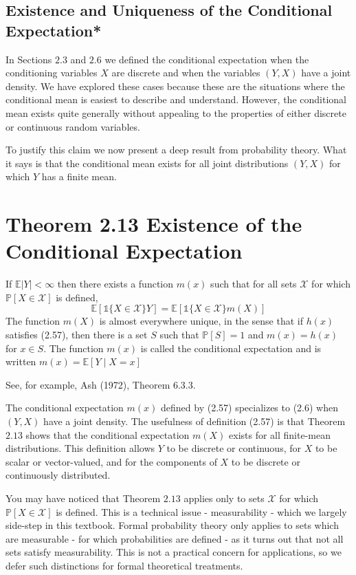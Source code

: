 \documentclass[10pt]{article}
\begin{document}
\subsection{Existence and Uniqueness of the Conditional Expectation*}
In Sections $2.3$ and $2.6$ we defined the conditional expectation when the conditioning variables $X$ are discrete and when the variables $(Y, X)$ have a joint density. We have explored these cases because these are the situations where the conditional mean is easiest to describe and understand. However, the conditional mean exists quite generally without appealing to the properties of either discrete or continuous random variables.

To justify this claim we now present a deep result from probability theory. What it says is that the conditional mean exists for all joint distributions $(Y, X)$ for which $Y$ has a finite mean.

\section{Theorem 2.13 Existence of the Conditional Expectation}
If $\mathbb{E}|Y|<\infty$ then there exists a function $m(x)$ such that for all sets $\mathscr{X}$ for which $\mathbb{P}[X \in \mathscr{X}]$ is defined,
$$
\mathbb{E}[\mathbb{1}\{X \in \mathscr{X}\} Y]=\mathbb{E}[\mathbb{1}\{X \in \mathscr{X}\} m(X)]
$$
The function $m(X)$ is almost everywhere unique, in the sense that if $h(x)$ satisfies (2.57), then there is a set $S$ such that $\mathbb{P}[S]=1$ and $m(x)=h(x)$ for $x \in S$. The function $m(x)$ is called the conditional expectation and is written $m(x)=\mathbb{E}[Y \mid X=x]$

See, for example, Ash (1972), Theorem 6.3.3.

The conditional expectation $m(x)$ defined by (2.57) specializes to (2.6) when $(Y, X)$ have a joint density. The usefulness of definition (2.57) is that Theorem $2.13$ shows that the conditional expectation $m(X)$ exists for all finite-mean distributions. This definition allows $Y$ to be discrete or continuous, for $X$ to be scalar or vector-valued, and for the components of $X$ to be discrete or continuously distributed.

You may have noticed that Theorem $2.13$ applies only to sets $\mathscr{X}$ for which $\mathbb{P}[X \in \mathscr{X}]$ is defined. This is a technical issue - measurability - which we largely side-step in this textbook. Formal probability theory only applies to sets which are measurable - for which probabilities are defined - as it turns out that not all sets satisfy measurability. This is not a practical concern for applications, so we defer such distinctions for formal theoretical treatments.
\end{document}
